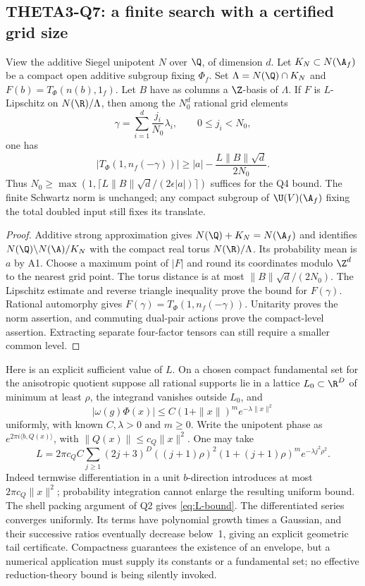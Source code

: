 \subsection{THETA3-Q7: a finite search with a certified grid size}\label{Q7}
View the additive Siegel unipotent $N$ over $\Q$, of dimension $d$. Let $K_N\subset N(\A_f)$ be a compact open additive subgroup fixing $\Phi_f$. Set
$\Lambda=N(\Q)\cap K_N$ and
$F(b)=T_\Phi(n(b),1_f)$. Let $B$ have as columns a $\Z$-basis of $\Lambda$. If $F$ is $L$-Lipschitz on $N(\R)/\Lambda$, then among the $N_0^d$ rational grid elements
\[
 \gamma=\sum_{i=1}^d\frac{j_i}{N_0}\lambda_i,
 \qquad 0\leq j_i<N_0,
\]
one has
\begin{equation}\label{eq:grid}
 |T_\Phi(1,n_f(-\gamma))|
 \geq |a|-\frac{L\|B\|\sqrt d}{2N_0}.
\end{equation}
Thus $N_0\geq\max(1,\lceil L\|B\|\sqrt d/(2\epsilon|a|)\rceil)$ suffices for the Q4 bound. The finite Schwartz norm is unchanged; any compact subgroup of $\U(V)(\A_f)$ fixing the total doubled input still fixes its translate.
\begin{proof}
Additive strong approximation gives $N(\Q)+K_N=N(\A_f)$ and identifies
$N(\Q)\backslash N(\A)/K_N$ with the compact real torus $N(\R)/\Lambda$. Its probability mean is $a$ by A1. Choose a maximum point of $|F|$ and round its coordinates modulo $\Z^d$ to the nearest grid point. The torus distance is at most $\|B\|\sqrt d/(2N_0)$. The Lipschitz estimate and reverse triangle inequality prove the bound for $F(\gamma)$. Rational automorphy gives $F(\gamma)=T_\Phi(1,n_f(-\gamma))$. Unitarity proves the norm assertion, and commuting dual-pair actions prove the compact-level assertion. Extracting separate four-factor tensors can still require a smaller common level.
\end{proof}
Here is an explicit sufficient value of $L$. On a chosen compact fundamental set for the anisotropic quotient suppose all rational supports lie in a lattice $L_0\subset\R^D$ of minimum at least $\rho$, the integrand vanishes outside $L_0$, and
\[
 |\omega(g)\Phi(x)|\leq C(1+\|x\|)^m e^{-\lambda\|x\|^2}
\]
uniformly, with known $C,\lambda>0$ and $m\geq0$. Write the unipotent phase as $e^{2\pi i\langle b,Q(x)\rangle}$, with
$\|Q(x)\|\leq c_Q\|x\|^2$. One may take
\begin{equation}\label{eq:L-bound}
 L=2\pi c_Q C\sum_{j\geq1}(2j+3)^D((j+1)\rho)^2
       (1+(j+1)\rho)^m e^{-\lambda j^2\rho^2}.
\end{equation}
Indeed termwise differentiation in a unit $b$-direction introduces at most $2\pi c_Q\|x\|^2$; probability integration cannot enlarge the resulting uniform bound. The shell packing argument of Q2 gives \eqref{eq:L-bound}. The differentiated series converges uniformly. Its terms have polynomial growth times a Gaussian, and their successive ratios eventually decrease below~1, giving an explicit geometric tail certificate. Compactness guarantees the existence of an envelope, but a numerical application must supply its constants or a fundamental set; no effective reduction-theory bound is being silently invoked.

